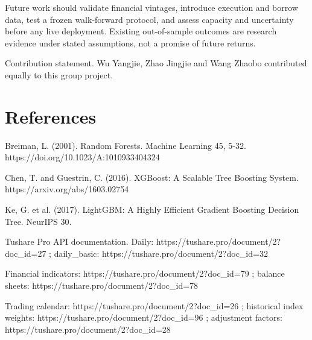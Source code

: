 \documentclass{article}
\begin{document}
Future work should validate financial vintages, introduce execution and borrow data, test a frozen walk-forward protocol, and assess capacity and uncertainty before any live deployment. Existing out-of-sample outcomes are research evidence under stated assumptions, not a promise of future returns.

Contribution statement. Wu Yangjie, Zhao Jingjie and Wang Zhaobo contributed equally to this group project.

\section*{References}
{\footnotesize Breiman, L. (2001). Random Forests. Machine Learning 45, 5-32. https://doi.org/10.1023/A:1010933404324\par}
{\footnotesize Chen, T. and Guestrin, C. (2016). XGBoost: A Scalable Tree Boosting System. https://arxiv.org/abs/1603.02754\par}
{\footnotesize Ke, G. et al. (2017). LightGBM: A Highly Efficient Gradient Boosting Decision Tree. NeurIPS 30.\par}
{\footnotesize Tushare Pro API documentation. Daily: https://tushare.pro/document/2?doc\_id=27 ; daily\_basic: https://tushare.pro/document/2?doc\_id=32\par}
{\footnotesize Financial indicators: https://tushare.pro/document/2?doc\_id=79 ; balance sheets: https://tushare.pro/document/2?doc\_id=78\par}
{\footnotesize Trading calendar: https://tushare.pro/document/2?doc\_id=26 ; historical index weights: https://tushare.pro/document/2?doc\_id=96 ; adjustment factors: https://tushare.pro/document/2?doc\_id=28\par}
\end{document}
